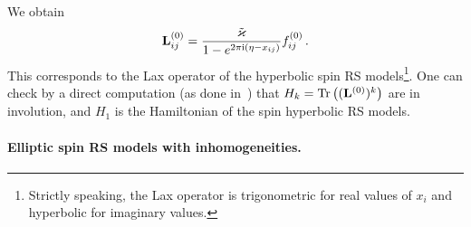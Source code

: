 We obtain
\begin{equation}
\mathbf{L}^{(0)}_{ij} =  \frac{\tilde{\varkappa}}{1-e^{2\pi\mathrm{i} (\eta-x_{ij})}} f^{(0)}_{ij} \,.
\end{equation}
This corresponds to the Lax operator of the hyperbolic spin RS models\footnote{Strictly speaking, the Lax operator is trigonometric for real values of $x_i$ and hyperbolic for imaginary values.}. One can check by a direct computation (as done in~\cite{arutyunov_hyperbolic_2019}) that $H_k= \operatorname{Tr} \left( (\mathbf{L}^{(0)})^k \right)$ are in involution, and $H_1$ is the Hamiltonian of the spin hyperbolic RS models.


\paragraph{Elliptic spin RS models with inhomogeneities.}

